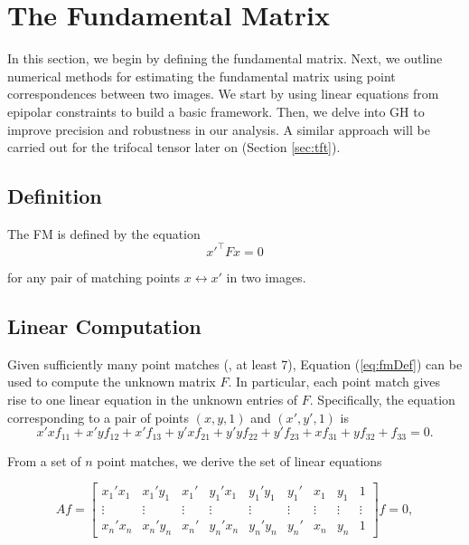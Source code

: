 \section{The Fundamental Matrix}\label{sec:fm}
In this section, we begin by defining the fundamental matrix. Next, we outline numerical methods for estimating the fundamental matrix using point correspondences between two images. We start by using linear equations from epipolar constraints to build a basic framework. Then, we delve into \ac{GH} \cite{12-gauss-helmert} to improve precision and robustness in our analysis. A similar approach will be carried out for the trifocal tensor later on (Section \ref{sec:tft}).

\subsection{Definition}
The \ac{FM} is defined by the equation
\begin{equation}
	x'^\top Fx = 0
	\label{eq:fmDef}
\end{equation}

for any pair of matching points \( x \leftrightarrow x' \) in two images. 

\subsection{Linear Computation}
Given sufficiently many point matches (\ie, at least 7), Equation (\ref{eq:fmDef}) can be used to compute the unknown matrix \( F \). In particular, each point match gives rise to one linear equation in the unknown entries of \( F \). Specifically, the equation corresponding to a pair of points \( (x, y, 1) \) and \( (x', y', 1) \) is
\begin{equation}
	x'xf_{11} + x'yf_{12} + x'f_{13} + y'xf_{21} + y'yf_{22} + y'f_{23} + xf_{31} + yf_{32} + f_{33} = 0.
\end{equation}

From a set of \( n \) point matches, we derive the set of linear equations

\begin{equation}
	Af = 
	\begin{bmatrix}
	x_1'x_1 & x_1'y_1 & x_1' & y_1'x_1 & y_1'y_1 & y_1' & x_1 & y_1 & 1\\
	\vdots & \vdots & \vdots & \vdots & \vdots & \vdots & \vdots & \vdots & \vdots\\
	x_n'x_n & x_n'y_n & x_n' & y_n'x_n & y_n'y_n & y_n' & x_n & y_n & 1
	\end{bmatrix}
	f = 0,
	\label{eq:LinearFM}
\end{equation}

